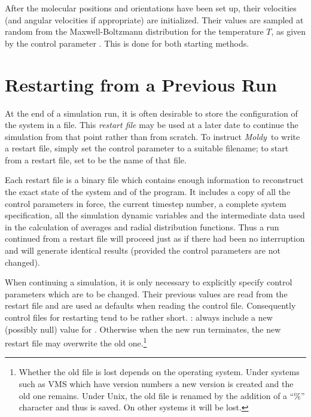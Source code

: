 \documentclass[a4paper,twoside]{report}
\newcommand{\moldy}{\emph{Moldy}}
\begin{document}
After the molecular positions and orientations have been set up, their
velocities (and angular velocities if appropriate) are initialized.
Their values are sampled at random from the
Maxwell-Boltzmann distribution for the temperature $T$, as given by
the control parameter .  This is done for both
starting methods.

\section{Restarting from a Previous Run}%
\label{sec:restarting}

At the end of a simulation run, it is often desirable to store the
configuration of the system in a file.  This \emph{restart file} may be
used at a later date to continue the simulation from that point rather
than from scratch.  To instruct \moldy\  to write a restart file, simply
set the control parameter  to a suitable filename; to
start from a restart file, set  to be the name of
that file.

Each restart file is a binary file which contains enough information
to reconstruct the exact state of the system and of the program.  It
includes a copy of all the control parameters in force, the current
timestep number, a complete system specification, all the simulation
dynamic variables and the intermediate data used in the calculation of
averages and radial distribution functions.  Thus a run continued from
a restart file will proceed just as if there had been no interruption
and will generate identical results (provided the control parameters
are not changed).

When continuing a simulation, it is only necessary to explicitly
specify control parameters which are to be changed.  Their previous
values are read from the restart file and are used as defaults when
reading the control file. Consequently control files for restarting
tend to be rather short. : always include a new
(possibly null) value for . Otherwise when the new run
terminates, the new restart file may overwrite the old
one.\footnote{Whether the old file is lost depends on the operating
  system. Under systems such as VMS which have version numbers a new
  version is created and the old one remains. Under Unix, the old file
  is renamed by the addition of a ``\%'' character and thus is saved.
  On other systems it will be lost.}
\end{document}
